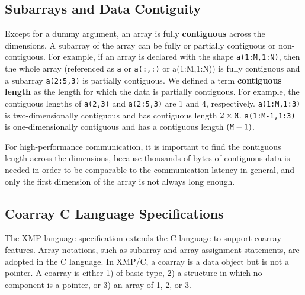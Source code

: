 \subsection{Subarrays and Data Contiguity}\label{sec:spec-contig}

Except for a dummy argument, an array is fully {\bf contiguous} across the dimensions.
A subarray of the array can be fully or partially contiguous or non-contiguous.
For example, if an array is declared with the shape {\tt a(1:M,1:N)},
then the whole array (referenced as {\tt a} or {\tt a(:,:)} or {a(1:M,1:N)})
is fully contiguous and a subarray {\tt a(2:5,3)} is partially contiguous.
We defined a term {\bf contiguous length} as the length for which the data is partially
contiguous. For example, the contiguous lengths of {\tt a(2,3)} and {\tt a(2:5,3)} are
1 and 4, respectively. {\tt a(1:M,1:3)} is two-dimensionally contiguous and has 
contiguous length $2 \times {\tt M}$.
{\tt a(1:M-1,1:3)} is one-dimensionally contiguous and has a 
contiguous length $({\tt M} - 1)$.

\requirement
For high-performance communication, it is important to find the contiguous length
across the dimensions, because thousands of bytes of contiguous data is needed in order to be 
comparable to the communication latency in general, and only the first dimension 
of the array is not always long enough.
%


\subsection{Coarray C Language Specifications}\label{sec:spec-c}

The XMP language specification extends the C language to support coarray 
features. Array notations, such as subarray and array assignment statements,
are adopted in the C language.
%
In XMP/C, a coarray is a data object but is not a pointer.
A coarray is either 1) of basic type, 2) a structure in which
no component is a pointer, or 3) an array of 1, 2, or 3.

